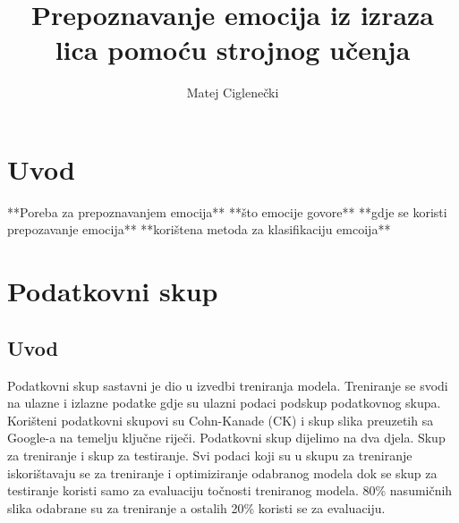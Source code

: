 \documentclass[times, utf8, zavrsni,numeric,pstricks]{fer}
\begin{document}

\title{Prepoznavanje emocija iz izraza lica pomoću strojnog učenja}

\author{Matej Ciglenečki}

\maketitle

\izvornik

\zahvala{}

\tableofcontents

\chapter{Uvod}
**Poreba za prepoznavanjem emocija**
**što emocije govore**
**gdje se koristi prepozavanje emocija**
**korištena metoda za klasifikaciju emcoija**


%



\chapter{Podatkovni skup}
\section{Uvod}
Podatkovni skup sastavni je dio u izvedbi treniranja modela. Treniranje se svodi na ulazne i izlazne podatke gdje su ulazni podaci podskup podatkovnog skupa. Korišteni podatkovni skupovi su Cohn-Kanade (CK) i skup slika preuzetih sa Google-a na temelju ključne riječi. Podatkovni skup dijelimo na dva djela. Skup za treniranje i skup za testiranje. Svi podaci koji su u skupu za treniranje iskorištavaju se za treniranje i optimiziranje odabranog modela dok se skup za testiranje koristi samo za evaluaciju točnosti treniranog modela. 80\% nasumičnih slika odabrane su za treniranje a ostalih 20\% koristi se za evaluaciju.
\end{document}
